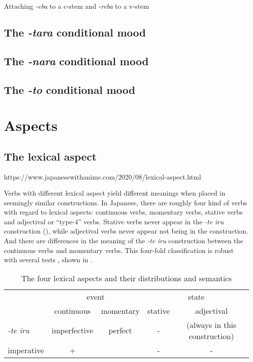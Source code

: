 \documentclass[UTF8, a4paper, oneside, scheme=plain]{ctexrep}
\newcommand*{\citesec}[1]{\S~{#1}}
\newcommand{\corpus}[1]{\emph{#1}}
\begin{document}
Attaching \corpus{-eba} to a c-stem and \corpus{-reba} to a v-stem 

\subsection{The \corpus{-tara} conditional mood}\label{sec:tara-form}

\subsection{The \corpus{-nara} conditional mood}

\subsection{The \corpus{-to} conditional mood}

\section{Aspects}\label{sec:aspect}

\subsection{The lexical aspect}\label{sec:lexical-aspect}

https://www.japanesewithanime.com/2020/08/lexical-aspect.html

Verbs with different lexical aspect yield different meanings 
when placed in seemingly similar constructions.
In Japanese, there are roughly four kind of verbs with regard to lexical aspects:
continuous verbs, momentary verbs, stative verbs and adjectival or ``type-4'' verbs.
Stative verbs never appear in the \corpus{-te iru} construction (),
while adjectival verbs never appear not being in the construction.
And there are differences in the meaning of the \corpus{-te iru} construction 
between the continuous verbs and momentary verbs.
This four-fold classification is robust with several tests \citep[\citesec{3.1}]{gu2004},
shown in .

\begin{table}[H]
    \centering
    \caption{The four lexical aspects and their distributions and semantics}
    \label{tbl:lexical-aspect}
    \begin{tabular}{lcccc}
        \toprule
                     & \multicolumn{2}{c}{event} & \multicolumn{2}{c}{state} \\
                     & continuous    & momentary & stative    & adjectival   \\ \midrule
    \corpus{-te iru} & imperfective  & perfect   & -          & (always in this construction)       \\ 
    imperative       & +             &           & -          & -             \\  \bottomrule
    \end{tabular}
\end{table}
\end{document}

